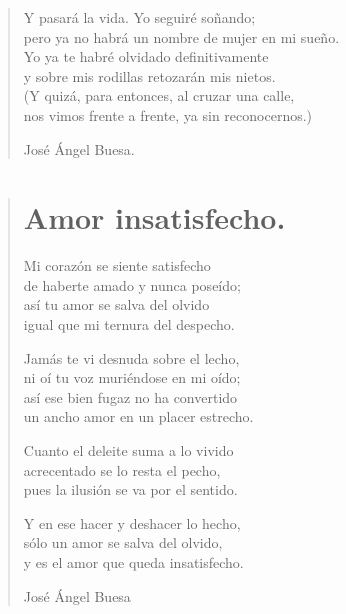\documentclass[11pt, portrait, twoside, notitlepage, openright]{book}
\begin{document}
\begin{verse}
Y pasará la vida. Yo seguiré soñando;\\
pero ya no habrá un nombre de mujer en mi sueño.\\
Yo ya te habré olvidado definitivamente\\
y sobre mis rodillas retozarán mis nietos.\\
(Y quizá, para entonces, al cruzar una calle,\\
nos vimos frente a frente, ya sin reconocernos.)
\newline

José Ángel Buesa.
\end{verse}

\newpage
\begin{verse}
\begin{center}
\section{Amor insatisfecho.}
\end{center}
Mi corazón se siente satisfecho\\
de haberte amado y nunca poseído;\\
así tu amor se salva del olvido\\
igual que mi ternura del despecho.
\newline

Jamás te vi desnuda sobre el lecho,\\
ni oí tu voz muriéndose en mi oído;\\
así ese bien fugaz no ha convertido\\
un ancho amor en un placer estrecho.
\newline

Cuanto el deleite suma a lo vivido\\
acrecentado se lo resta el pecho,\\
pues la ilusión se va por el sentido.
\newline

Y en ese hacer y deshacer lo hecho,\\
sólo un amor se salva del olvido,\\
y es el amor que queda insatisfecho.
\newline

José Ángel Buesa
\end{verse}
\end{document}
